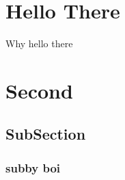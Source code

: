 \documentclass[12pt, a4paper]{article}
\newcommand{\black}[0]{\color{black}}
\begin{document}
	
	\newpage
	\tableofcontents
	\newpage
	
	\pagestyle{fancy}\fancyhf{}
	\lhead{}\chead{}\rhead{}
	\renewcommand{\headrulewidth}{0.15em}
	\renewcommand{\footrulewidth}{0.15em}
	\renewcommand{\headrule}{\hbox to\headwidth{\black\leaders\hrule height\headrulewidth\hfill}}
	\renewcommand{\footrule}{\hbox to\headwidth{\black\leaders\hrule height\footrulewidth\hfill}}
	
	\section{Hello There}
	Why hello there
	\section{Second}
	\subsection{SubSection}
	\subsubsection{subby boi}
\end{document}
